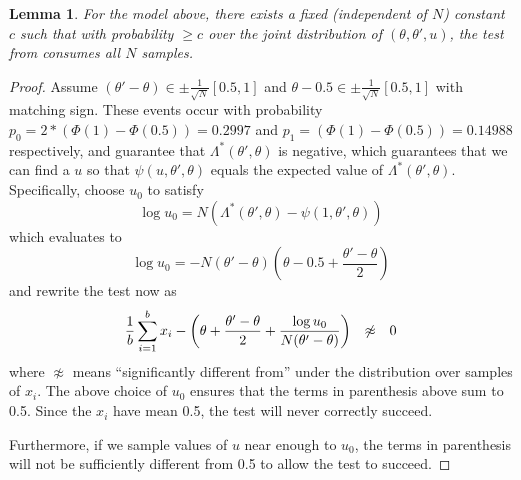 \documentclass{article}
\newtheorem{lemma}{Lemma}
\begin{document}
\begin{lemma}\label{lem:efficienty_cutting}
  For the model above, there
  exists a fixed (independent of $N$) constant $c$ such that with probability $ \geq c$ over the joint
  distribution of $(\theta, \theta', u)$, the
  test from \cite{icml2014c1_bardenet14} consumes all $N$ samples. 
\end{lemma}

\begin{proof} Assume $(\theta' - \theta) \in \pm\frac{1}{\sqrt{N}}[0.5,1]$ and
  $\theta -0.5 \in \pm\frac{1}{\sqrt{N}}[0.5,1]$ with matching sign. These events
  occur with probability $p_0=2*(\Phi(1)-\Phi(0.5)) = 0.2997$ and $p_1=(\Phi(1)-\Phi(0.5))=0.14988$ respectively,
  and guarantee that $\Lambda^*(\theta',\theta)$ is negative, which guarantees that we can find
  a $u$ so that $\psi(u,\theta',\theta)$ equals the expected value of $\Lambda^*(\theta',\theta)$.
  Specifically, choose $u_0$
  to satisfy
  \begin{equation}
    \log u_0 = N(\Lambda^*(\theta',\theta)-\psi(1,\theta',\theta))
  \end{equation}
  which evaluates to 
  \begin{equation}
    \log u_0 = -N(\theta'-\theta)\left(\theta-0.5+\frac{\theta'-\theta}{2}\right) 
  \end{equation}
  and rewrite the test now as
  \begin{equation}
    \frac{1}{b}\sum_{i=1}^b x_i-\left(\theta+\frac{\theta'-\theta}{2} + \frac{\log u_0}{N(\theta'-\theta)}\right)
    \hspace{0.1in} \not\approx \hspace{0.1in} 0
  \end{equation}
  where $\not\approx$ means ``significantly different from'' under the distribution over samples of $x_i$. 
  The above choice of $u_0$ ensures that the terms in parenthesis above sum to 0.5. Since the $x_i$ have mean 0.5, the
  test will never correctly succeed.

  Furthermore, if we sample values of $u$ near enough to $u_0$, the terms in parenthesis will not be sufficiently different
  from 0.5 to allow the test to succeed. 
  

\end{proof}
\end{document}
